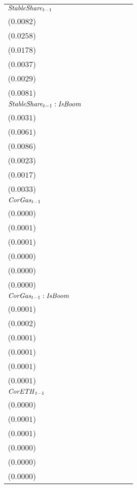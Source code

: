 \begin{tabular}{lllllll}
${\it StableShare}_{t-1}$ & \makecell{$0.0681^{***}$ \\ ($0.0082$)} & \makecell{$0.1968^{***}$ \\ ($0.0258$)} & \makecell{$0.1156^{***}$ \\ ($0.0178$)} & \makecell{$-0.0024^{}$ \\ ($0.0037$)} & \makecell{$-0.0076^{***}$ \\ ($0.0029$)} & \makecell{$0.0704^{***}$ \\ ($0.0081$)} \\
${\it StableShare}_{t-1}:{\it IsBoom}$ & \makecell{$-0.0157^{***}$ \\ ($0.0031$)} & \makecell{$-0.0169^{***}$ \\ ($0.0061$)} & \makecell{$-0.0549^{***}$ \\ ($0.0086$)} & \makecell{$-0.0085^{***}$ \\ ($0.0023$)} & \makecell{$-0.0033^{*}$ \\ ($0.0017$)} & \makecell{$-0.0189^{***}$ \\ ($0.0033$)} \\
${\it CorGas}_{t-1}$ & \makecell{$0.0000^{}$ \\ ($0.0000$)} & \makecell{$0.0000^{}$ \\ ($0.0001$)} & \makecell{$0.0001^{*}$ \\ ($0.0001$)} & \makecell{$0.0000^{}$ \\ ($0.0000$)} & \makecell{$0.0000^{}$ \\ ($0.0000$)} & \makecell{$0.0000^{}$ \\ ($0.0000$)} \\
${\it CorGas}_{t-1}:{\it IsBoom}$ & \makecell{$0.0001^{}$ \\ ($0.0001$)} & \makecell{$-0.0000^{}$ \\ ($0.0002$)} & \makecell{$0.0001^{}$ \\ ($0.0001$)} & \makecell{$0.0001^{}$ \\ ($0.0001$)} & \makecell{$0.0000^{}$ \\ ($0.0001$)} & \makecell{$0.0001^{}$ \\ ($0.0001$)} \\
${\it CorETH}_{t-1}$ & \makecell{$-0.0000^{}$ \\ ($0.0000$)} & \makecell{$-0.0001^{**}$ \\ ($0.0001$)} & \makecell{$0.0000^{}$ \\ ($0.0001$)} & \makecell{$0.0000^{}$ \\ ($0.0000$)} & \makecell{$0.0000^{*}$ \\ ($0.0000$)} & \makecell{$-0.0000^{}$ \\ ($0.0000$)} \\

\end{tabular}

